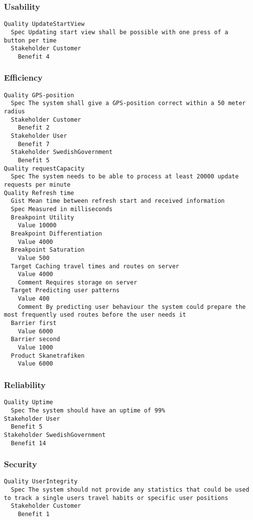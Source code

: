 \begin{lstlisting}

\end{lstlisting}


       \subsubsection{Usability}


\begin{lstlisting}
Quality UpdateStartView
  Spec Updating start view shall be possible with one press of a button per time
  Stakeholder Customer
    Benefit 4

\end{lstlisting}
    
        
       \subsubsection{Efficiency}


\begin{lstlisting}
Quality GPS-position
  Spec The system shall give a GPS-position correct within a 50 meter radius
  Stakeholder Customer
    Benefit 2
  Stakeholder User
    Benefit 7
  Stakeholder SwedishGovernment
    Benefit 5
Quality requestCapacity
  Spec The system needs to be able to process at least 20000 update requests per minute
Quality Refresh time
  Gist Mean time between refresh start and received information
  Spec Measured in milliseconds
  Breakpoint Utility
    Value 10000
  Breakpoint Differentiation
    Value 4000
  Breakpoint Saturation
    Value 500
  Target Caching travel times and routes on server
    Value 4000
    Comment Requires storage on server
  Target Predicting user patterns
    Value 400
    Comment By predicting user behaviour the system could prepare the most frequently used routes before the user needs it
  Barrier first
    Value 6000
  Barrier second
    Value 1000
  Product Skanetrafiken
    Value 6000

\end{lstlisting}
    
        
       \subsubsection{Reliability}


\begin{lstlisting}
Quality Uptime
  Spec The system should have an uptime of 99%
Stakeholder User
  Benefit 5
Stakeholder SwedishGovernment
  Benefit 14

\end{lstlisting}
    
        
       \subsubsection{Security}


\begin{lstlisting}
Quality UserIntegrity
  Spec The system should not provide any statistics that could be used to track a single users travel habits or specific user positions
  Stakeholder Customer
    Benefit 1

\end{lstlisting}